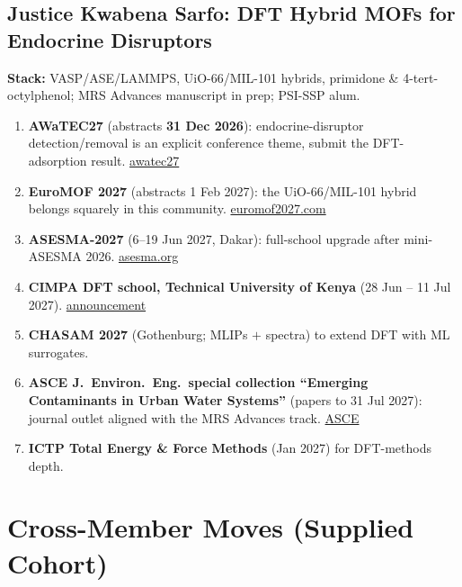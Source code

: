 \documentclass[11pt,a4paper]{article}
\begin{document}
\subsection{Justice Kwabena Sarfo: DFT Hybrid MOFs for Endocrine Disruptors}
\textbf{Stack:} VASP/ASE/LAMMPS, UiO-66/MIL-101 hybrids, primidone \& 4-tert-octylphenol; MRS Advances manuscript in prep; PSI-SSP alum.
\begin{enumerate}[leftmargin=1.6em]
  \item \textbf{AWaTEC27} (abstracts \textbf{31 Dec 2026}): endocrine-disruptor detection/removal is an explicit conference theme, submit the DFT-adsorption result. \href{https://awatec27.dista.uninsubria.it/}{awatec27}
  \item \textbf{EuroMOF 2027} (abstracts 1 Feb 2027): the UiO-66/MIL-101 hybrid belongs squarely in this community. \href{https://euromof2027.com/}{euromof2027.com}
  \item \textbf{ASESMA-2027} (6--19 Jun 2027, Dakar): full-school upgrade after mini-ASESMA 2026. \href{https://asesma.org/programs}{asesma.org}
  \item \textbf{CIMPA DFT school, Technical University of Kenya} (28 Jun -- 11 Jul 2027). \href{https://materials-modelling-group.github.io/events/workshops/2026/03/24/cimpa-school-2027.html}{announcement}
  \item \textbf{CHASAM 2027} (Gothenburg; MLIPs $+$ spectra) to extend DFT with ML surrogates.
  \item \textbf{ASCE J.~Environ.\ Eng.\ special collection ``Emerging Contaminants in Urban Water Systems''} (papers to 31 Jul 2027): journal outlet aligned with the MRS Advances track. \href{https://ascelibrary.org/joeedu/cfp-emerging-contaminants-urban-water-systems}{ASCE}
  \item \textbf{ICTP Total Energy \& Force Methods} (Jan 2027) for DFT-methods depth.
\end{enumerate}

\section{Cross-Member Moves (Supplied Cohort)}
\end{document}
